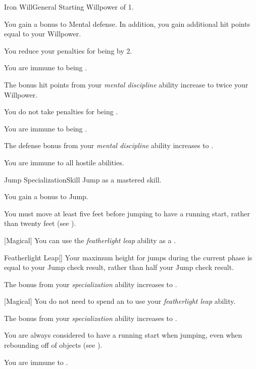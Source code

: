     \begin{feat}{Iron Will}{General}
        \featpre Starting Willpower of 1.

         You gain a  bonus to Mental defense.
        In addition, you gain additional hit points equal to your Willpower.

         You reduce your penalties for being  by 2.

         You are immune to being .

         The bonus hit points from your \textit{mental discipline} ability increase to twice your Willpower.

         You do not take penalties for being .

         You are immune to being .

         The defense bonus from your \textit{mental discipline} ability increases to .

         You are immune to all hostile  abilities.
    \end{feat}

    \begin{feat}{Jump Specialization}{Skill}
        \featpre Jump as a mastered skill.

         You gain a  bonus to Jump.

         You must move at least five feet before jumping to have a running start, rather than twenty feet (see ).

        [Magical] You can use the \textit{featherlight leap} ability as a .
        \begin{apability}{Featherlight Leap}[]
            Your maximum height for jumps during the current phase is equal to your Jump check result, rather than half your Jump check result.
        \end{apability}

         The bonus from your \textit{specialization} ability increases to .

        [Magical] You do not need to spend an  to use your \textit{featherlight leap} ability.

         The bonus from your \textit{specialization} ability increases to .

         You are always considered to have a running start when jumping, even when rebounding off of objects (see ).

         You are immune to .
    \end{feat}

